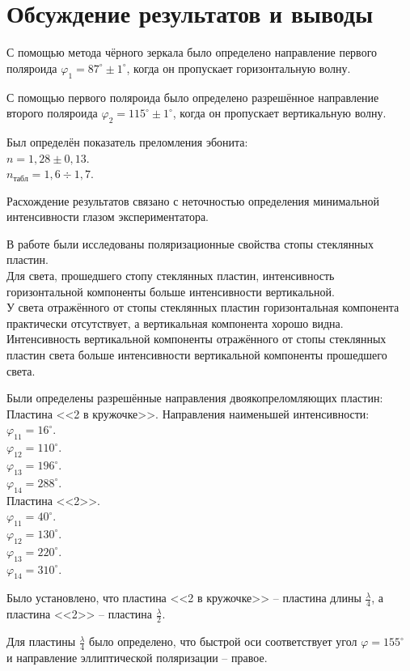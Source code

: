 \section*{Обсуждение результатов и выводы}

С помощью метода чёрного зеркала было определено направление первого поляроида $\varphi_1 = 87^{\circ} \pm 1^{\circ}$, когда он пропускает горизонтальную волну.

С помощью первого поляроида было определено разрешённое направление второго поляроида $\varphi_2 = 115^\circ \pm 1^{\circ}$, когда он пропускает вертикальную волну.

Был определён показатель преломления эбонита: \\
$n = 1,28 \pm 0,13$. \\
$n_{табл} = 1,6 \div 1,7$.

Расхождение результатов связано с неточностью определения минимальной интенсивности глазом экспериментатора.

В работе были исследованы поляризационные свойства стопы стеклянных пластин. \\
Для света, прошедшего стопу стеклянных пластин, интенсивность горизонтальной компоненты больше интенсивности вертикальной. \\
У света отражённого от стопы стеклянных пластин горизонтальная компонента практически отсутствует, а вертикальная компонента хорошо видна. \\
Интенсивность вертикальной компоненты отражённого от стопы стеклянных пластин света больше интенсивности вертикальной компоненты прошедшего света.

Были определены разрешённые направления двоякопреломляющих пластин: \\
Пластина <<2 в кружочке>>. Направления наименьшей интенсивности: \\
$\varphi_{11} = 16^\circ$. \\
$\varphi_{12} = 110^\circ$. \\
$\varphi_{13} = 196^\circ$. \\
$\varphi_{14} = 288^\circ$. \\
Пластина <<2>>. \\
$\varphi_{11} = 40^\circ$. \\
$\varphi_{12} = 130^\circ$. \\
$\varphi_{13} = 220^\circ$. \\
$\varphi_{14} = 310^\circ$.

Было установлено, что пластина <<2 в кружочке>> -- пластина длины $\frac{\lambda}{4}$, а пластина <<2>> -- пластина $\frac{\lambda}{2}$.

Для пластины $\frac{\lambda}{4}$ было определено, что быстрой оси соответствует угол $\varphi = 155^\circ$ и направление эллиптической поляризации -- правое.